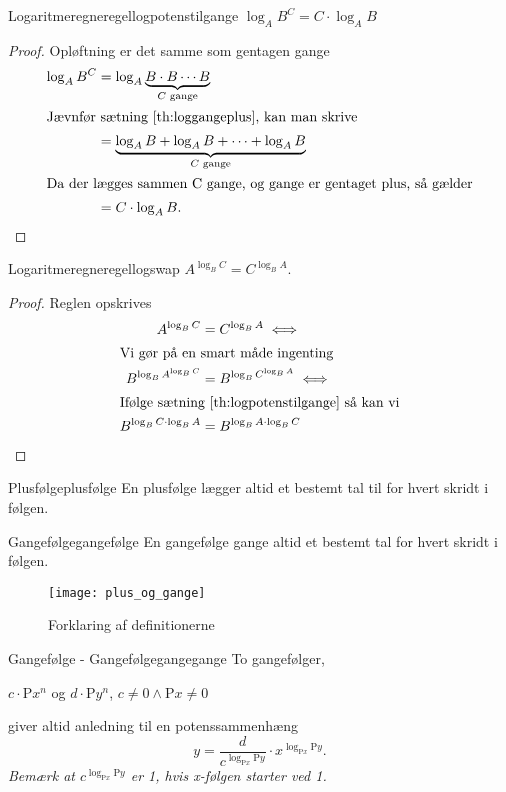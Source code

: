 \documentclass{article}
\newcommand{\Rho}{\mathrm{P}}
\begin{document}
\begin{theorem}{Logaritmeregneregel}{logpotenstilgange}
	$\log_AB^C = C \cdot \log_AB$
\end{theorem}

\begin{proof}
Opløftning er det samme som gentagen gange
\begin{align*}
	\log_AB^C &= \log_A{\underbrace{B \cdot B \cdots B}_{C\text{ gange}}}\\
\intertext{Jævnfør sætning \ref{th:loggangeplus}, kan man skrive}
			  &= \underbrace{\log_A{B} + \log_A{B} + \cdots + \log_A{B}}_{C\text{ gange}}\\
\intertext{Da der lægges sammen C gange, og gange er gentaget plus, så gælder}
			  &= C \cdot \log_AB.\qedhere
\end{align*}
\end{proof}

\begin{theorem}{Logaritmeregneregel}{logswap}
	$A^{\log_BC} = C^{\log_BA}$.
\end{theorem}

\begin{proof}
Reglen opskrives
\begin{align*}
	A^{\log_BC} &= C^{\log_BA} \iff\\
\intertext{Vi gør på en smart måde ingenting}
	B^{\log_B{A^{\log_BC}}} &= B^{\log_B{C^{\log_BA}}} \iff\\
\intertext{Ifølge sætning \ref{th:logpotenstilgange} så kan vi}
	B^{\log_BC \cdot \log_B{A}} &= B^{\log_BA \cdot \log_B{C}}\qedhere
\end{align*}
\end{proof}

\begin{definition}{Plusfølge}{plusfølge}
	En plusfølge lægger altid et bestemt tal til for hvert skridt i følgen.
\end{definition}

\begin{definition}{Gangefølge}{gangefølge}
	En gangefølge gange altid et bestemt tal for hvert skridt i følgen.
\end{definition}

\begin{figure}[H]
	\centering
	\caption{Forklaring af definitionerne}
	\texttt{[image: plus\_og\_gange]}
	\label{plus_og_gange}
\end{figure}

\begin{theorem}{Gangefølge - Gangefølge}{gangegange}
	To gangefølger,
	\begin{center}
		$c\cdot \Rho x^n$ og $d\cdot \Rho y^n$, $c \ne 0 \land \Rho x \ne 0$
	\end{center}
	giver altid anledning til en potenssammenhæng
	\[
		y = \frac{d}{c^{\log_{\Rho x}{\Rho y}}}\cdot x^{\log_{\Rho x}{\Rho y}}.
	\]
	\textit{Bemærk at $c^{\log_{\Rho x}{\Rho y}}$ er 1, hvis x-følgen starter ved 1.}
\end{theorem}
\end{document}
